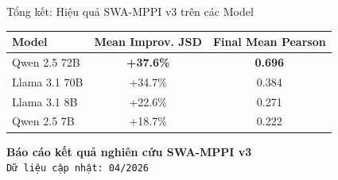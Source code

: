\documentclass[11pt, aspectratio=169]{beamer}
\begin{document}
\begin{frame}{Tổng kết: Hiệu quả SWA-MPPI v3 trên các Model}
    \centering
    \begin{tabular}{l c c}
    \toprule
    \textbf{Model} & \textbf{Mean Improv. JSD} & \textbf{Final Mean Pearson} \\
    \midrule
    Qwen 2.5 72B & \textbf{+37.6\%} & \textbf{0.696} \\
    Llama 3.1 70B & +34.7\% & 0.384 \\
    Llama 3.1 8B & +22.6\% & 0.271 \\
    Qwen 2.5 7B & +18.7\% & 0.222 \\
    \bottomrule
    \end{tabular}
\end{frame}

\begin{frame}
    \centering
    \vspace{1cm}
    \large \textbf{Báo cáo kết quả nghiên cứu SWA-MPPI v3} \\
    \small \texttt{Dữ liệu cập nhật: 04/2026}
\end{frame}
\end{document}
